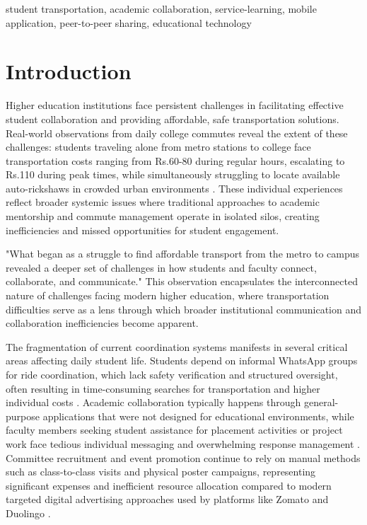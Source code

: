 \documentclass[conference]{IEEEtran}
\begin{document}
\begin{IEEEkeywords}
student transportation, academic collaboration, service-learning, mobile application, peer-to-peer sharing, educational technology
\end{IEEEkeywords}

\section{Introduction}

Higher education institutions face persistent challenges in facilitating effective student collaboration and providing affordable, safe transportation solutions. Real-world observations from daily college commutes reveal the extent of these challenges: students traveling alone from metro stations to college face transportation costs ranging from Rs.60-80 during regular hours, escalating to Rs.110 during peak times, while simultaneously struggling to locate available auto-rickshaws in crowded urban environments \cite{ref1}\cite{ref2}. These individual experiences reflect broader systemic issues where traditional approaches to academic mentorship and commute management operate in isolated silos, creating inefficiencies and missed opportunities for student engagement.

"What began as a struggle to find affordable transport from the metro to campus revealed a deeper set of challenges in how students and faculty connect, collaborate, and communicate." This observation encapsulates the interconnected nature of challenges facing modern higher education, where transportation difficulties serve as a lens through which broader institutional communication and collaboration inefficiencies become apparent.

The fragmentation of current coordination systems manifests in several critical areas affecting daily student life. Students depend on informal WhatsApp groups for ride coordination, which lack safety verification and structured oversight, often resulting in time-consuming searches for transportation and higher individual costs \cite{ref3}\cite{ref4}. Academic collaboration typically happens through general-purpose applications that were not designed for educational environments, while faculty members seeking student assistance for placement activities or project work face tedious individual messaging and overwhelming response management \cite{ref5}\cite{ref6}. Committee recruitment and event promotion continue to rely on manual methods such as class-to-class visits and physical poster campaigns, representing significant expenses and inefficient resource allocation compared to modern targeted digital advertising approaches used by platforms like Zomato and Duolingo \cite{ref7}\cite{ref8}.
\end{document}
